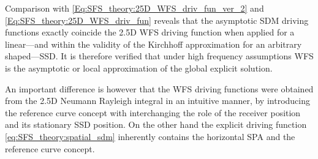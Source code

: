 Comparison with \eqref{Eq:SFS_theory:25D_WFS_driv_fun_ver_2} and \eqref{Eq:SFS_theory:25D_WFS_driv_fun} reveals that the asymptotic SDM driving functions exactly coincide the 2.5D WFS driving function when applied for a linear---and within the validity of the Kirchhoff approximation for an arbitrary shaped---SSD.
It is therefore verified that under high frequency assumptions WFS is the asymptotic or local approximation of the global explicit solution.

An important difference is however that the WFS driving functions were obtained from the 2.5D Neumann Rayleigh integral in an intuitive manner, by introducing the reference curve concept with interchanging the role of the receiver position and its stationary SSD position. 
On the other hand the explicit driving function \eqref{eq:SFS_theory:spatial_sdm} inherently contains the horizontal SPA and the reference curve concept.
%
